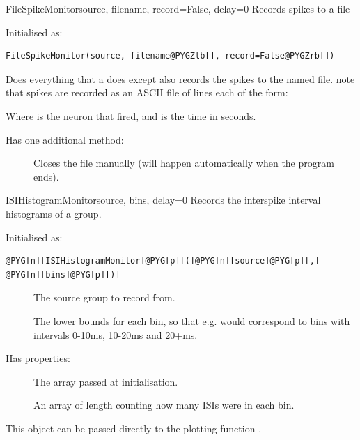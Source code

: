 \documentclass[letterpaper,10pt,english]{manual}
\begin{document}
\hypertarget{brian.FileSpikeMonitor}{}\begin{classdesc}{FileSpikeMonitor}{source, filename, record=False, delay=0}
Records spikes to a file

Initialised as:

\begin{Verbatim}[commandchars=@\[\]]
FileSpikeMonitor(source, filename@PYGZlb[], record=False@PYGZrb[])
\end{Verbatim}

Does everything that a \hyperlink{brian.SpikeMonitor}{} does except also records
the spikes to the named file. note that spikes are recorded
as an ASCII file of lines each of the form:
\begin{quote}

\end{quote}

Where  is the neuron that fired, and  is the time in seconds.

Has one additional method:
\begin{description}
\item[] \leavevmode
Closes the file manually (will happen automatically when
the program ends).

\end{description}
\end{classdesc}

\hypertarget{brian.ISIHistogramMonitor}{}\begin{classdesc}{ISIHistogramMonitor}{source, bins, delay=0}
Records the interspike interval histograms of a group.

Initialised as:

\begin{Verbatim}[commandchars=@\[\]]
@PYG[n][ISIHistogramMonitor]@PYG[p][(]@PYG[n][source]@PYG[p][,] @PYG[n][bins]@PYG[p][)]
\end{Verbatim}
\begin{description}
\item[] \leavevmode
The source group to record from.

\item[] \leavevmode
The lower bounds for each bin, so that e.g.
 would correspond to
bins with intervals 0-10ms, 10-20ms and
20+ms.

\end{description}

Has properties:
\begin{description}
\item[] \leavevmode
The  array passed at initialisation.

\item[] \leavevmode
An array of length  counting how many ISIs
were in each bin.

\end{description}

This object can be passed directly to the plotting function
\hyperlink{brian.hist_plot}{}.
\end{classdesc}
\end{document}
